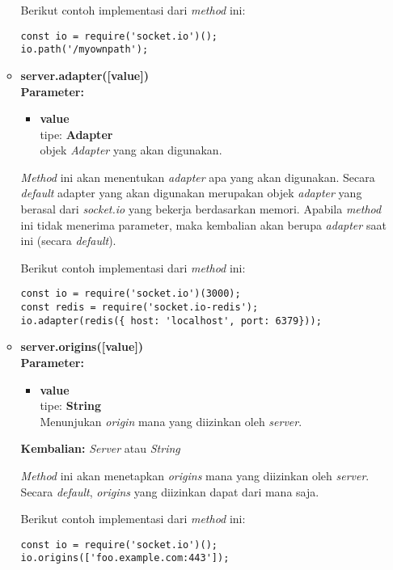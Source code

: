 \begin{enumerate}
\begin{itemize}
			Berikut contoh implementasi dari \textit{method} ini:
\begin{lstlisting}
const io = require('socket.io')();
io.path('/myownpath');
\end{lstlisting}
	
			\item \textbf{server.adapter([value])} \\
			\textbf{Parameter:}
			\begin{itemize}
				\item \textbf{value} \\tipe: \textbf{Adapter} \\ objek \textit{Adapter} yang akan digunakan.
			\end{itemize}
			\textit{Method} ini akan menentukan \textit{adapter} apa yang akan digunakan. Secara \textit{default} adapter yang akan digunakan merupakan objek \textit{adapter} yang berasal dari \textit{socket.io} yang bekerja berdasarkan memori. Apabila \textit{method} ini tidak menerima parameter, maka kembalian akan berupa \textit{adapter} saat ini (secara \textit{default}).
			
			Berikut contoh implementasi dari \textit{method} ini:
\begin{lstlisting}
const io = require('socket.io')(3000);
const redis = require('socket.io-redis');
io.adapter(redis({ host: 'localhost', port: 6379}));
\end{lstlisting}
	
			\item \textbf{server.origins([value])} \\ 
			\textbf{Parameter:} 
			\begin{itemize}
				\item \textbf{value} \\tipe: \textbf{String} \\ Menunjukan \textit{origin} mana yang diizinkan oleh \textit{server}.
			\end{itemize}
			\textbf{Kembalian:} \textit{Server} atau \textit{String}
			
			\textit{Method} ini akan menetapkan \textit{origins} mana yang diizinkan oleh \textit{server}. Secara \textit{default}, \textit{origins} yang diizinkan dapat dari mana saja.
			
			Berikut contoh implementasi dari \textit{method} ini:
\begin{lstlisting}
const io = require('socket.io')();
io.origins(['foo.example.com:443']);
\end{lstlisting}
			

\end{itemize}
\end{enumerate}

